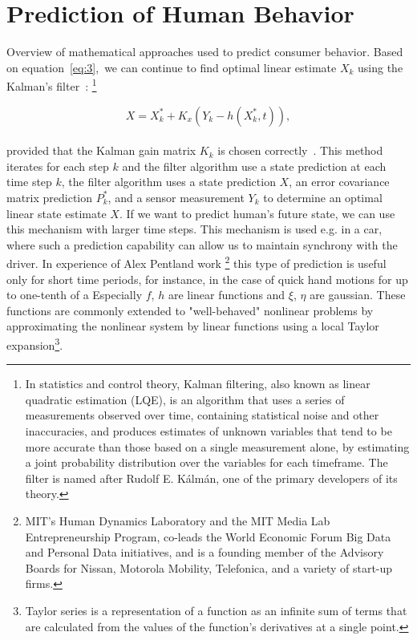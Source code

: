 \section{Prediction of Human Behavior} \label{sec:prediction}
Overview of mathematical approaches used to predict consumer behavior.
Based on equation~\ref{eq:3},\ we can continue to find optimal linear estimate $X_k$ using the Kalman's filter~\cite{pantland}: \footnote{In statistics
and control theory, Kalman filtering, also known as linear quadratic estimation (LQE), is an algorithm that
uses a series of measurements observed over time, containing statistical noise and other inaccuracies, and produces
estimates of unknown variables that tend to be more accurate than those based on a single measurement alone, by estimating
a joint probability distribution over the variables for each timeframe.
The filter is named after Rudolf E. Kálmán, one of the primary developers of its theory.}

\begin{equation} \label{eq:6}
X = X_{k}^{*} + K_x(Y_k - h(X_{k}^{*},t)),
\end{equation}
\\
provided that the Kalman gain matrix $K_k$ is chosen correctly~\cite{kalman}.
This method iterates for each step $k$ and the filter algorithm use a state prediction at each time step $k$, the filter algorithm
uses a state prediction $X$, an error covariance matrix prediction $P_k^*$, and a sensor measurement $Y_k$ to determine an optimal linear state estimate $X$.
If we want to predict human’s future state, we can use this mechanism with larger time steps.
This mechanism is used e.g. in a car, where such a prediction capability can allow us to maintain synchrony with the driver.
In experience of Alex Pentland work \footnote{MIT's Human Dynamics Laboratory and the MIT Media Lab Entrepreneurship
Program, co-leads the World Economic Forum Big Data and Personal Data initiatives, and is a founding member
of the Advisory Boards for Nissan, Motorola Mobility, Telefonica, and a variety of start-up firms.} this type of prediction is useful only for short time periods,
for instance, in the case of quick hand motions for up to one-tenth of a
Especially $f$, $h$ are linear functions and $\xi$, $\eta$ are gaussian.
These functions are commonly extended to "well-behaved" nonlinear problems by approximating
the nonlinear system by linear functions using a local Taylor expansion\footnote{Taylor series is a representation of a function
as an infinite sum of terms that are calculated from the values of the function's derivatives at a single point.}.

